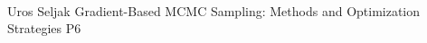     \\\hline
{}	%
{}		%
{Uros Seljak}	%
{Gradient-Based MCMC Sampling: Methods and Optimization Strategies}		%
{P6}		%
\\\hline
